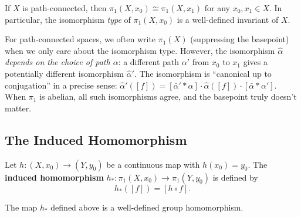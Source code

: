 \documentclass[11pt]{report}
\begin{document}
\begin{corbox}
If $X$ is path-connected, then $\pi_1(X, x_0) \cong \pi_1(X, x_1)$ for any $x_0, x_1 \in X$. In particular, the isomorphism \emph{type} of $\pi_1(X, x_0)$ is a well-defined invariant of $X$.
\end{corbox}

\begin{rembox}
For path-connected spaces, we often write $\pi_1(X)$ (suppressing the basepoint) when we only care about the isomorphism type. However, the isomorphism $\hat{\alpha}$ \emph{depends on the choice of path $\alpha$}: a different path $\alpha'$ from $x_0$ to $x_1$ gives a potentially different isomorphism $\hat{\alpha}'$. The isomorphism is ``canonical up to conjugation'' in a precise sense: $\hat{\alpha}'([f]) = [\bar{\alpha}' * \alpha] \cdot \hat{\alpha}([f]) \cdot [\bar{\alpha} * \alpha']$. When $\pi_1$ is abelian, all such isomorphisms agree, and the basepoint truly doesn't matter.
\end{rembox}

\subsection{The Induced Homomorphism}

\begin{defbox}
Let $h: (X, x_0) \to (Y, y_0)$ be a continuous map with $h(x_0) = y_0$. The \textbf{induced homomorphism} $h_*: \pi_1(X, x_0) \to \pi_1(Y, y_0)$ is defined by
\[h_*([f]) = [h \circ f].\]
\end{defbox}

\begin{propbox}
The map $h_*$ defined above is a well-defined group homomorphism.
\end{propbox}
\end{document}
